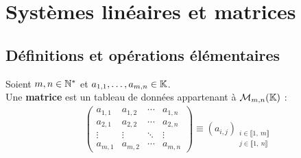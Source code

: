 \chapter{Systèmes linéaires et matrices}
\def\arraystretch{1}

\section{Définitions et opérations élémentaires}
\begin{definition}[Matrice]
	Soient $m,n \in \mathbb{N}^*$ et $a_{1,1}, \ldots, a_{m,n} \in \mathbb{K}$. 
	\\
    Une \textbf{matrice} est un tableau de données appartenant à $\mathcal{M}_{m,n} (\mathbb{K})$ :
    \begin{align*}
        \begin{pmatrix}
            a_{1,1} & a_{1,2} & \cdots & a_{1,n} \\
            a_{2,1} & a_{2,2} & \cdots & a_{2,n} \\
            \vdots & \vdots & \ddots & \vdots \\
            a_{m,1} & a_{m,2} & \cdots & a_{m,n}
        \end{pmatrix}
        \equiv 
        (a_{i,j})_{\substack{i \in \llbracket 1,\ m \rrbracket \\ j \in \llbracket 1,\ n \rrbracket}}
    \end{align*}
\end{definition}

